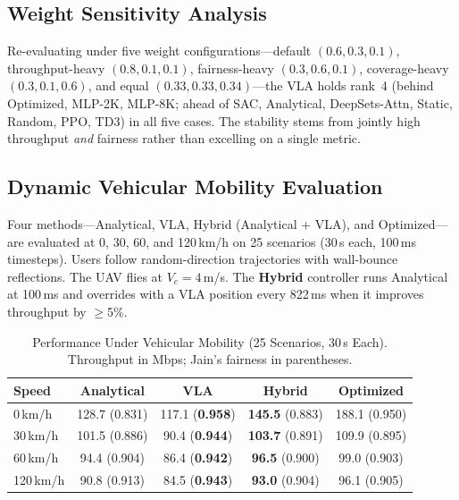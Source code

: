 \documentclass[journal]{IEEEtran}
\begin{document}
\subsection{Weight Sensitivity Analysis}
\label{sec:weight_sensitivity}

Re-evaluating under five weight configurations---default $(0.6, 0.3, 0.1)$, throughput-heavy $(0.8, 0.1, 0.1)$, fairness-heavy $(0.3, 0.6, 0.1)$, coverage-heavy $(0.3, 0.1, 0.6)$, and equal $(0.33, 0.33, 0.34)$---the VLA holds rank~4 (behind Optimized, MLP-2K, MLP-8K; ahead of SAC, Analytical, DeepSets-Attn, Static, Random, PPO, TD3) in all five cases. The stability stems from jointly high throughput \emph{and} fairness rather than excelling on a single metric.


\subsection{Dynamic Vehicular Mobility Evaluation}
\label{sec:mobility}

Four methods---Analytical, VLA, Hybrid (Analytical + VLA), and Optimized---are evaluated at 0, 30, 60, and 120\,km/h on 25 scenarios (30\,s each, 100\,ms timesteps). Users follow random-direction trajectories with wall-bounce reflections. The UAV flies at $V_c{=}4$\,m/s. The \textbf{Hybrid} controller runs Analytical at 100\,ms and overrides with a VLA position every 822\,ms when it improves throughput by $\geq$5\%.

\begin{table}[!t]
    \centering
    \caption{Performance Under Vehicular Mobility (25 Scenarios, 30\,s Each). Throughput in Mbps; Jain's fairness in parentheses.}
    \label{tab:mobility}
    \footnotesize
    \begin{tabular}{@{}l@{\hskip 4pt}c@{\hskip 4pt}c@{\hskip 4pt}c@{\hskip 4pt}c@{}}
        \toprule
        \textbf{Speed} & \textbf{Analytical} & \textbf{VLA} & \textbf{Hybrid} & \textbf{Optimized} \\
        \midrule
        0\,km/h & 128.7 (0.831) & 117.1 (\textbf{0.958}) & \textbf{145.5} (0.883) & 188.1 (0.950) \\
        30\,km/h & 101.5 (0.886) & 90.4 (\textbf{0.944}) & \textbf{103.7} (0.891) & 109.9 (0.895) \\
        60\,km/h & 94.4 (0.904) & 86.4 (\textbf{0.942}) & \textbf{96.5} (0.900) & 99.0 (0.903) \\
        120\,km/h & 90.8 (0.913) & 84.5 (\textbf{0.943}) & \textbf{93.0} (0.904) & 96.1 (0.905) \\
        \bottomrule
    \end{tabular}
\end{table}
\end{document}
